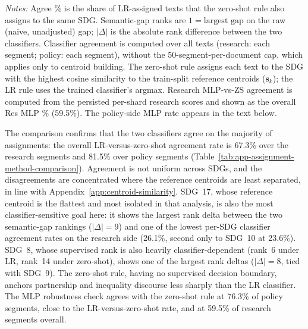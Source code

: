 \documentclass[12pt,a4paper]{article}
\begin{document}
\begin{table}[ht]
\centering
\footnotesize
\caption{Classifier agreement between the supervised LR classifier and the zero-shot nearest-centroid rule, by SDG and overall, under the canonical MPNet encoder and keyword retrieval.}
\label{tab:app-assignment-method-comparison}
\resizebox{\textwidth}{!}{}
\par\smallskip\footnotesize\emph{Notes:} Agree \% is the share of LR-assigned texts that the zero-shot rule also assigns to the same SDG. Semantic-gap ranks are $1 = \text{largest gap}$ on the raw (naive, unadjusted) gap; $|\Delta|$ is the absolute rank difference between the two classifiers. Classifier agreement is computed over all texts (research: each segment; policy: each segment), without the 50-segment-per-document cap, which applies only to centroid building. The zero-shot rule assigns each text to the SDG with the highest cosine similarity to the train-split reference centroids ($\mathbf{s}_k$); the LR rule uses the trained classifier's argmax. Research MLP-vs-ZS agreement is computed from the persisted per-shard research scores and shown as the overall Res MLP \% (59.5\%). The policy-side MLP rate appears in the text below.\par
\end{table}

The comparison confirms that the two classifiers agree on the majority of assignments: the overall LR-versus-zero-shot agreement rate is 67.3\% over the \NResearchSegments{} research segments and 81.5\% over policy segments (Table~\ref{tab:app-assignment-method-comparison}). Agreement is not uniform across SDGs, and the disagreements are concentrated where the reference centroids are least separated, in line with Appendix~\ref{app:centroid-similarity}. SDG~17, whose reference centroid is the flattest and most isolated in that analysis, is also the most classifier-sensitive goal here: it shows the largest rank delta between the two semantic-gap rankings ($|\Delta| = 9$) and one of the lowest per-SDG classifier agreement rates on the research side (26.1\%, second only to SDG~10 at 23.6\%). SDG~8, whose supervised rank is also heavily classifier-dependent (rank~6 under LR, rank~14 under zero-shot), shows one of the largest rank deltas ($|\Delta| = 8$, tied with SDG~9). The zero-shot rule, having no supervised decision boundary, anchors partnership and inequality discourse less sharply than the LR classifier. The MLP robustness check agrees with the zero-shot rule at 76.3\% of policy segments, close to the LR-versus-zero-shot rate, and at 59.5\% of research segments overall.
\end{document}
